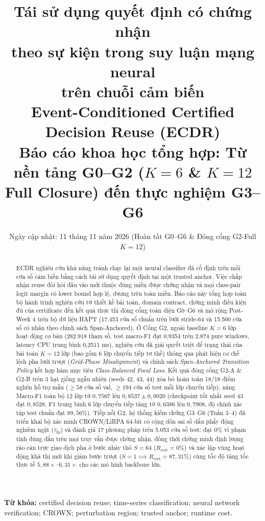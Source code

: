 \documentclass[11pt,a4paper]{article}
\title{\textcolor{ink}{Tái sử dụng quyết định có chứng nhận\\
theo sự kiện trong suy luận mạng neural\\trên chuỗi cảm biến}\\[8pt]
\large Event-Conditioned Certified Decision Reuse (ECDR)\\
\normalsize Báo cáo khoa học tổng hợp: Từ nền tảng G0--G2 ($K=6$ \& $K=12$ Full Closure) đến thực nghiệm G3--G6}
\author{}
\date{Ngày cập nhật: 11 tháng 11 năm 2026 (Hoàn tất G0--G6 \& Đóng cổng G2-Full $K=12$)}
\newcommand{\code}[1]{\texttt{\detokenize{#1}}}
\begin{document}
\maketitle
\begin{abstract}
ECDR nghiên cứu khả năng tránh chạy lại một neural classifier đã cố định trên
mỗi cửa sổ cảm biến bằng cách tái sử dụng quyết định tại một trusted anchor.
Việc chấp nhận reuse đòi hỏi đầu vào mới thuộc đúng miền được chứng nhận và
mọi class-pair logit margin có lower bound hợp lệ, dương trên toàn miền.
Báo cáo này tổng hợp toàn bộ hành trình nghiên cứu từ thiết kế bài toán,
domain contract, chứng minh điều kiện đủ của certificate đến kết quả thực thi
đóng cổng toàn diện G0--G6 và mở rộng Post-Week 4 trên bộ dữ liệu HAPT (17.453 cửa sổ
chuẩn trên lưới stride-64 và 15.500 cửa sổ có nhãn theo chính sách Span-Anchored).
Ở Cổng G2, ngoài baseline $K=6$ lớp hoạt động cơ bản (282.918 tham số, test macro-F1 đạt 0,9354
trên 2.874 pure windows, latency CPU trung bình 0,2511 ms), nghiên cứu đã giải quyết triệt để
trạng thái \code{HOLD_CONDITIONAL} của bài toán $K=12$ lớp (bao gồm 6 lớp chuyển tiếp tư thế)
thông qua phát hiện cơ chế lệch pha lưới trượt (\emph{Grid-Phase Misalignment}) và
chính sách \emph{Span-Anchored Transition Policy} kết hợp hàm mục tiêu \emph{Class-Balanced Focal Loss}.
Kết quả đóng cổng G2-A \& G2-B trên 3 hạt giống ngẫu nhiên (seeds 42, 43, 44) xóa bỏ hoàn toàn
18/18 điểm nghẽn hỗ trợ mẫu ($\ge 58$ cửa sổ val, $\ge 194$ cửa sổ test mỗi lớp chuyển tiếp),
nâng Macro-F1 toàn bộ 12 lớp từ $0{,}7567$ lên $0{,}8537 \pm 0{,}0020$ (checkpoint tốt nhất seed 43 đạt
$0{,}8528$, F1 trung bình 6 lớp chuyển tiếp tăng từ $0{,}6386$ lên $0{,}7908$, độ chính xác tập test chuẩn
đạt $89{,}56\%$). Tiếp nối G2, hệ thống kiểm chứng G3--G6 (Tuần 3--4) đã triển khai bộ xác minh
CROWN/LiRPA 64-bit có cộng dồn sai số dấu phẩy động nghiêm ngặt ($\tau_{\text{fp}}$) và đánh giá
17 phương pháp trên 5.053 cửa sổ test: đạt $0\%$ vi phạm tính đúng đắn trên mọi truy vấn được chứng nhận,
đồng thời chứng minh định lượng rào cản trực giao dịch pha ở bước nhảy thô $S=64$ ($R_{\text{cert}} = 0\%$)
và xác lập vùng hoạt động khả thi mới khi giảm bước trượt ($S=1 \implies R_{\text{cert}} = 87{,}31\%$)
cùng tốc độ tăng tốc thực tế $5{,}88\times\text{--}6{,}31\times$ cho các mô hình backbone lớn.
\end{abstract}
\textbf{Từ khóa:} certified decision reuse; time-series classification; neural
network verification; CROWN; perturbation region; trusted anchor; runtime cost.

\tableofcontents
\newpage
\end{document}
